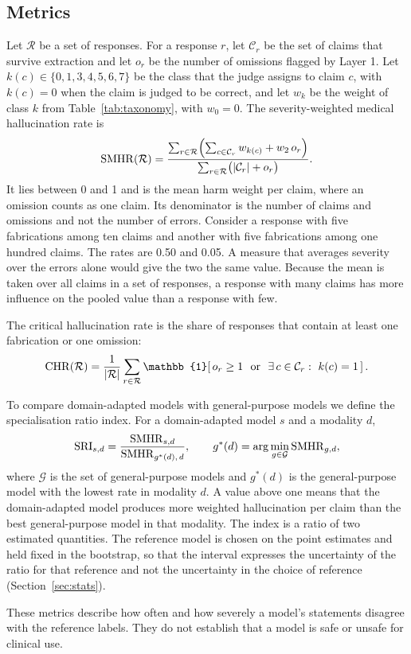 \subsection{Metrics}\label{sec:metrics}
Let $\mathcal{R}$ be a set of responses. For a response $r$, let $\mathcal{C}_r$ be the set of claims that survive extraction and let $o_r$ be the number of omissions flagged by Layer 1. Let $k(c)\in\{0,1,3,4,5,6,7\}$ be the class that the judge assigns to claim $c$, with $k(c)=0$ when the claim is judged to be correct, and let $w_k$ be the weight of class $k$ from Table~\ref{tab:taxonomy}, with $w_0=0$. The severity-weighted medical hallucination rate is
\begin{equation}
  \mathrm{SMHR}(\mathcal{R}) = \frac{\sum_{r\in\mathcal{R}}\Bigl(\sum_{c\in\mathcal{C}_r} w_{k(c)} + w_2\, o_r\Bigr)}{\sum_{r\in\mathcal{R}}\bigl(|\mathcal{C}_r| + o_r\bigr)} .
\end{equation}
It lies between 0 and 1 and is the mean harm weight per claim, where an omission counts as one claim. Its denominator is the number of claims and omissions and not the number of errors. Consider a response with five fabrications among ten claims and another with five fabrications among one hundred claims. The rates are 0.50 and 0.05. A measure that averages severity over the errors alone would give the two the same value. Because the mean is taken over all claims in a set of responses, a response with many claims has more influence on the pooled value than a response with few.

The critical hallucination rate is the share of responses that contain at least one fabrication or one omission:
\begin{equation}
  \CHR(\mathcal{R}) = \frac{1}{|\mathcal{R}|}\sum_{r\in\mathcal{R}} \mathbb{1}\!\left[\, o_r\ge 1 \ \text{ or } \ \exists\, c\in\mathcal{C}_r:\ k(c)=1 \,\right].
\end{equation}

To compare domain-adapted models with general-purpose models we define the specialisation ratio index. For a domain-adapted model $s$ and a modality $d$,
\begin{equation}
  \mathrm{SRI}_{s,d} = \frac{\mathrm{SMHR}_{s,d}}{\mathrm{SMHR}_{g^\ast(d),\,d}}, \qquad g^\ast(d)=\arg\min_{g\in\mathcal{G}} \mathrm{SMHR}_{g,d},
\end{equation}
where $\mathcal{G}$ is the set of general-purpose models and $g^\ast(d)$ is the general-purpose model with the lowest rate in modality $d$. A value above one means that the domain-adapted model produces more weighted hallucination per claim than the best general-purpose model in that modality. The index is a ratio of two estimated quantities. The reference model is chosen on the point estimates and held fixed in the bootstrap, so that the interval expresses the uncertainty of the ratio for that reference and not the uncertainty in the choice of reference (Section~\ref{sec:stats}).

These metrics describe how often and how severely a model's statements disagree with the reference labels. They do not establish that a model is safe or unsafe for clinical use.
